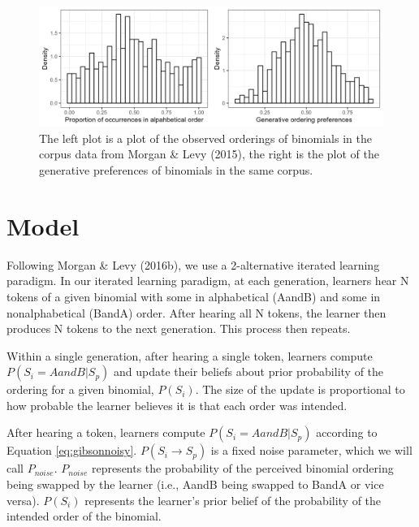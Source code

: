 \documentclass[10pt, letterpaper]{article}
\newenvironment{CodeChunk}{}{}
\begin{document}
\begin{CodeChunk}
\begin{figure}[tb]

{\centering \includegraphics[width=1\linewidth]{Figures/corpus_plots} 

}

\caption[The left plot is a plot of the observed orderings of binomials in the corpus data from Morgan \& Levy (2015), the right is the plot of the generative preferences of binomials in the same corpus]{The left plot is a plot of the observed orderings of binomials in the corpus data from Morgan \& Levy (2015), the right is the plot of the generative preferences of binomials in the same corpus.}\label{fig:corpusplot1}
\end{figure}
\end{CodeChunk}

\hypertarget{model}{%
\section{Model}\label{model}}

Following Morgan \& Levy (2016b), we use a 2-alternative iterated
learning paradigm. In our iterated learning paradigm, at each
generation, learners hear N tokens of a given binomial with some in
alphabetical (AandB) and some in nonalphabetical (BandA) order. After
hearing all N tokens, the learner then produces N tokens to the next
generation. This process then repeats.

Within a single generation, after hearing a single token, learners
compute \(P(S_i = AandB|S_p)\) and update their beliefs about prior
probability of the ordering for a given binomial, \(P(S_i)\). The size
of the update is proportional to how probable the learner believes it is
that each order was intended.

After hearing a token, learners compute \(P(S_i = AandB|S_p)\) according
to Equation \ref{eq:gibsonnoisy}. \(P(S_i \to S_p)\) is a fixed noise
parameter, which we will call \(P_{noise}\). \(P_{noise}\) represents
the probability of the perceived binomial ordering being swapped by the
learner (i.e., AandB being swapped to BandA or vice versa). \(P(S_i)\)
represents the learner's prior belief of the probability of the intended
order of the binomial.
\end{document}
